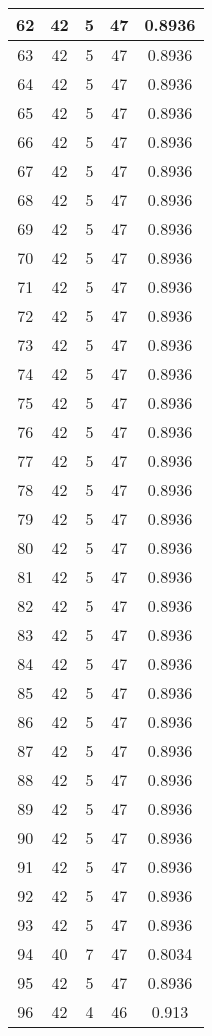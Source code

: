 \documentclass[letterpaper, 12pt]{article}
\begin{document}
\begin{longtable}{|c|c|c|c|c|}
\hline
62 & 42 & 5 & 47 & 0.8936 \\
\hline
63 & 42 & 5 & 47 & 0.8936 \\
\hline
64 & 42 & 5 & 47 & 0.8936 \\
\hline
65 & 42 & 5 & 47 & 0.8936 \\
\hline
66 & 42 & 5 & 47 & 0.8936 \\
\hline
67 & 42 & 5 & 47 & 0.8936 \\
\hline
68 & 42 & 5 & 47 & 0.8936 \\
\hline
69 & 42 & 5 & 47 & 0.8936 \\
\hline
70 & 42 & 5 & 47 & 0.8936 \\
\hline
71 & 42 & 5 & 47 & 0.8936 \\
\hline
72 & 42 & 5 & 47 & 0.8936 \\
\hline
73 & 42 & 5 & 47 & 0.8936 \\
\hline
74 & 42 & 5 & 47 & 0.8936 \\
\hline
75 & 42 & 5 & 47 & 0.8936 \\
\hline
76 & 42 & 5 & 47 & 0.8936 \\
\hline
77 & 42 & 5 & 47 & 0.8936 \\
\hline
78 & 42 & 5 & 47 & 0.8936 \\
\hline
79 & 42 & 5 & 47 & 0.8936 \\
\hline
80 & 42 & 5 & 47 & 0.8936 \\
\hline
81 & 42 & 5 & 47 & 0.8936 \\
\hline
82 & 42 & 5 & 47 & 0.8936 \\
\hline
83 & 42 & 5 & 47 & 0.8936 \\
\hline
84 & 42 & 5 & 47 & 0.8936 \\
\hline
85 & 42 & 5 & 47 & 0.8936 \\
\hline
86 & 42 & 5 & 47 & 0.8936 \\
\hline
87 & 42 & 5 & 47 & 0.8936 \\
\hline
88 & 42 & 5 & 47 & 0.8936 \\
\hline
89 & 42 & 5 & 47 & 0.8936 \\
\hline
90 & 42 & 5 & 47 & 0.8936 \\
\hline
91 & 42 & 5 & 47 & 0.8936 \\
\hline
92 & 42 & 5 & 47 & 0.8936 \\
\hline
93 & 42 & 5 & 47 & 0.8936 \\
\hline
94 & 40 & 7 & 47 & 0.8034 \\
\hline
95 & 42 & 5 & 47 & 0.8936 \\
\hline
96 & 42 & 4 & 46 & 0.913 \\

\end{longtable}
\end{document}
